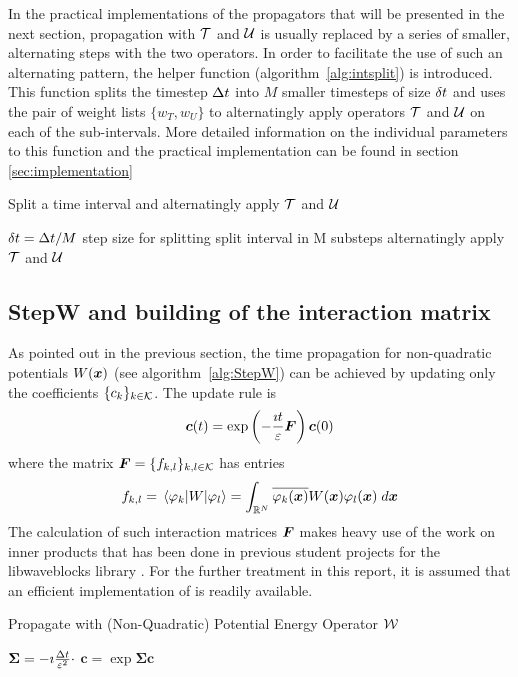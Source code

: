 %
In the practical implementations of the propagators that will be presented in the next section, propagation with $\mathcal{T}$ and $\mathcal{U}$ is usually replaced by a series of smaller, alternating steps with the two operators.
In order to facilitate the use of such an alternating pattern, the helper function  (algorithm~\ref{alg:intsplit}) is introduced.
This function splits the timestep $\Delta t$ into $M$ smaller timesteps of size $\delta t$ and uses the pair of weight lists $\{ w_T, w_U \}$ to alternatingly apply operators $\mathcal{T}$ and $\mathcal{U}$ on each of the sub-intervals.
More detailed information on the individual parameters to this function and the practical implementation can be found in section \ref{sec:implementation}
%
\begin{algorithm}[h]
	\caption{Split a time interval and alternatingly apply $\mathcal{T}$ and $\mathcal{U}$}
	\label{alg:intsplit}
	\begin{algorithmic}
		\State
			\State
			\State $\delta t = \Delta t/M$
			\Comment step size for splitting
			\Comment split interval in M substeps
				\Comment alternatingly apply $\mathcal{T}$ and $\mathcal{U}$
					\State {}
					\State {}
				\EndFor
			\EndFor
		\State
		\EndProcedure
	\end{algorithmic}
\end{algorithm}


\subsection{StepW and building of the interaction matrix}
%
As pointed out in the previous section, the time propagation for non-quadratic potentials $W(\bm{x})$ (see algorithm~\ref{alg:StepW}) can be achieved by updating only the coefficients $\{ c_k \}_{k \in \mathcal{K}}$.
The update rule is
%
\begin{align}
	\bm{c}(t) = \exp \left( - \frac{\imath t}{\varepsilon} \bm{F} \right) \bm{c}(0)
\end{align}
%
where the matrix $\bm{F} = \{ f_{k,l} \}_{k,l \in \mathcal{K}}$ has entries
%
\begin{align}
	f_{k,l} = \matrixel{\varphi_k}{W}{\varphi_l}
	= \int_{\R^N} \conj{\varphi_k(\bvec{x})} W(\bvec{x}) \varphi_l(\bvec{x}) \; \dif \bvec{x}
\end{align}
%
The calculation of such interaction matrices $\bm{F}$ makes heavy use of the work on inner products that has been done in previous student projects for the libwaveblocks library \cite{libwaveblocks}.
For the further treatment in this report, it is assumed that an efficient implementation of  is readily available.
%
\begin{algorithm}[h]
	\caption{Propagate with (Non-Quadratic) Potential Energy Operator $\mathcal{W}$}
	\label{alg:StepW}
	\begin{algorithmic}
		\State
		\Procedure{StepW}{$\upic,\Dt$}
			\State $\bm{\Sigma} = - \imath \frac{\Delta t}{\varepsilon^2} \cdot$ \Call{BuildF}{$\Pi$}
			\State $\bm{c} = \exp{\bm{\Sigma}} \bm{c}$
		\EndProcedure
		\State
	\end{algorithmic}
\end{algorithm}
